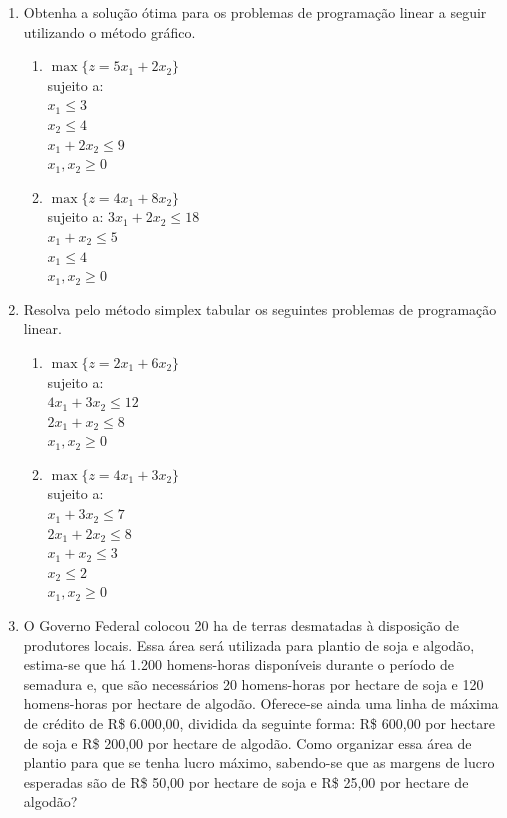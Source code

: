 \documentclass[
	12pt,				%
	openright,			%
	twoside,			%
	a4paper,			%
	english,			%
	french,				%
	brazil,				%
	sumario=tradicional
]{abntex2}
\numberwithin{example}{chapter}
\numberwithin{remark}{chapter}
\numberwithin{definition}{chapter}
\numberwithin{figure}{chapter}
\begin{document}
\begin{enumerate}
	\item Obtenha a solução ótima para os problemas de programação linear a seguir utilizando o método gráfico.
	\begin{enumerate}
	    \item $\max \{z=5x_1+2x_2\}$\\
	    sujeito a:\\
	    $x_1\leqslant 3$\\
	    $x_2\leqslant 4$\\
	    $x_1 + 2x_2\leqslant 9$\\
	    $x_1, x_2 \geqslant 0$
	    
	    \item $\max\{z=4x_1+8x_2\}$\\
		sujeito a:
		$3x_1+2x_2\leqslant 18$\\
		$x_1+x_2\leqslant 5$\\
		$x_1\leqslant 4$\\
		$x_1, x_2 \geqslant 0$
	\end{enumerate}
	
	\item Resolva pelo método simplex tabular os seguintes problemas de programação linear.
	\begin{enumerate}
	    \item $\max\{z=2x_1+6x_2\}$\\
	    sujeito a:\\
	    $4x_1+3x_2\leqslant 12$\\
	    $2x_1+x_2\leqslant 8$\\
	    $x_1, x_2\geqslant 0$
	
	    \item $\max\{z=4x_1+3x_2\}$\\
	    sujeito a:\\
	    $x_1+3x_2\leqslant 7$\\
	    $2x_1+2x_2\leqslant 8$\\
	    $x_1+x_2\leqslant 3$\\
	    $x_2\leqslant 2$\\
	    $x_1, x_2 \geqslant 0$
	\end{enumerate}
	
	\item O Governo Federal colocou 20 ha de terras desmatadas à disposição de produtores locais. Essa área será utilizada para plantio de soja e algodão, estima-se que há 1.200 homens-horas disponíveis durante o período de semadura e, que são necessários 20 homens-horas por hectare de soja e 120 homens-horas por hectare de algodão. Oferece-se ainda uma linha de máxima de crédito de R\$ 6.000,00, dividida da seguinte forma: R\$ 600,00 por hectare de soja e R\$ 200,00 por hectare de algodão. Como organizar essa área de plantio para que se tenha lucro máximo, sabendo-se que as margens de lucro esperadas são de R\$ 50,00 por hectare de soja e R\$ 25,00 por hectare de algodão?


\end{enumerate}
\end{document}
